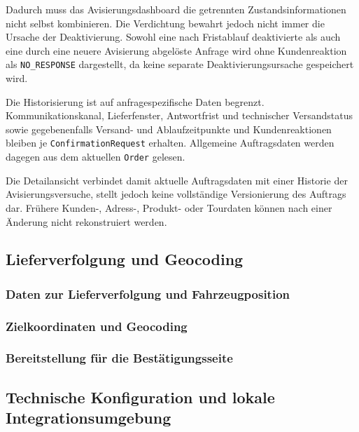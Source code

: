 \documentclass[
  12pt,
  a4paper,
  oneside
]{article}
\newcommand{\contentplaceholder}{%
  \par\noindent\rule{0pt}{\baselineskip}\par
}
\begin{document}
Dadurch muss das Avisierungsdashboard die getrennten Zustandsinformationen nicht
selbst kombinieren. Die Verdichtung bewahrt jedoch nicht immer die Ursache der
Deaktivierung. Sowohl eine nach Fristablauf deaktivierte als auch eine durch
eine neuere Avisierung abgelöste Anfrage wird ohne Kundenreaktion als
\texttt{NO\_RESPONSE} dargestellt, da keine separate Deaktivierungsursache
gespeichert wird.

Die Historisierung ist auf anfragespezifische Daten begrenzt.
Kommunikationskanal, Lieferfenster, Antwortfrist und technischer Versandstatus
sowie gegebenenfalls Versand- und Ablaufzeitpunkte und Kundenreaktionen bleiben
je \texttt{ConfirmationRequest} erhalten. Allgemeine Auftragsdaten werden
dagegen aus dem aktuellen \texttt{Order} gelesen.

Die Detailansicht verbindet damit aktuelle Auftragsdaten mit einer Historie der
Avisierungsversuche, stellt jedoch keine vollständige Versionierung des
Auftrags dar. Frühere Kunden-, Adress-, Produkt- oder Tourdaten können nach
einer Änderung nicht rekonstruiert werden.

\subsection{Lieferverfolgung und Geocoding}
\label{sec:lieferverfolgung}

\subsubsection{Daten zur Lieferverfolgung und Fahrzeugposition}
\contentplaceholder

\subsubsection{Zielkoordinaten und Geocoding}
\contentplaceholder

\subsubsection{Bereitstellung für die Bestätigungsseite}
\contentplaceholder

\subsection{Technische Konfiguration und lokale Integrationsumgebung}
\label{sec:technische-konfiguration}
\end{document}
